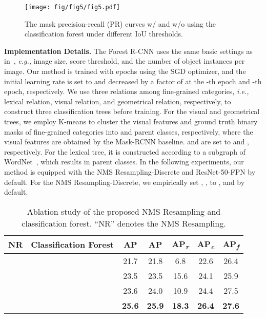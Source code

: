 \documentclass[sigconf]{acmart}
\newcommand{\myparagraph}[1]{{\vspace{0.5em} \noindent \bf #1}}
\begin{document}
\begin{figure*}
	\centering
	\texttt{[image: fig/fig5/fig5.pdf]}
	\vspace{-7mm}
	\caption{The mask precision-recall (PR) curves w/ and w/o using the classification forest under different IoU thresholds.}
	\vspace{-3mm}
	\label{fig:pr_cureve}
\end{figure*}

\myparagraph{Implementation Details.} The Forest R-CNN uses the same basic settings as in~\cite{lvis}, \emph{e.g.,} image size, score threshold, and the number of object instances per image. Our method is trained with  epochs using the SGD optimizer, and the initial learning rate is set to  and decreased by a factor of  at the -th epoch and -th epoch, respectively. We use three relations among fine-grained categories, \emph{i.e.,} lexical relation, visual relation, and geometrical relation, respectively, to construct three classification trees before training. For the visual and geometrical trees, we employ K-means to cluster the visual features and ground truth binary masks of  fine-grained categories into  and  parent classes, respectively, where the visual features are obtained by the Mask-RCNN baseline.  and  are set to  and , respectively. For the lexical tree, it is constructed according to a subgraph of WordNet~\cite{wordnet}, which results in  parent classes. In the following experiments, our method is equipped with the NMS Resampling-Discrete and ResNet-50-FPN by default. For the NMS Resampling-Discrete, we empirically set , ,  to ,  and  by default.

\begin{table}
	\centering
	\caption{Ablation study of the proposed NMS Resampling and classification forest. ``NR'' denotes the NMS Resampling.}
	\vspace{-3mm}
	\label{tab:tab2}
	\begin{tabular}{cc|c c| c c c}
		NR& Classification Forest  & AP& AP & AP\textsubscript{\textit{r}} & AP\textsubscript{\textit{c}} & AP\textsubscript{\textit{f}}\\
		\toprule[1.3pt]
		&&21.7&21.8&6.8&22.6&26.4\\
		\Checkmark&&23.5&23.5&15.6&24.1&25.9\\
		&\Checkmark&23.6&24.0&10.9&24.4&27.5\\
		\Checkmark&\Checkmark&\bf25.6&\bf25.9&\bf18.3&\bf26.4&\bf27.6 	
	\end{tabular}
\vspace{-3mm}
\end{table}
\end{document}
